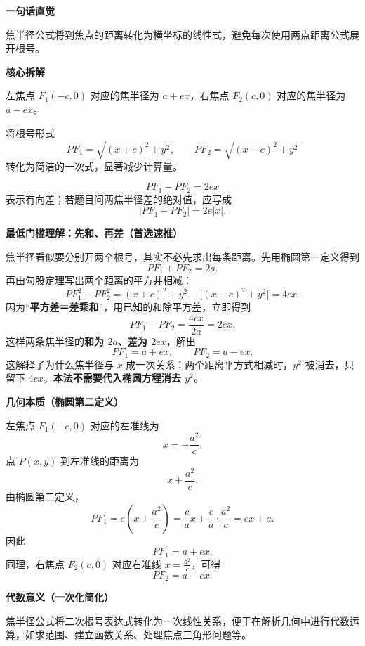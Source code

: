 \begin{explanationbox}
	\textbf{\textcolor{CExplanation}{一句话直觉}}

	焦半径公式将到焦点的距离转化为横坐标的线性式，避免每次使用两点距离公式展开根号。

	\medskip
	\textbf{\textcolor{CExplanation}{核心拆解}}
	\begin{description}[style=nextline, leftmargin=2.8em, labelsep=0.5em, itemsep=0.45em]
		\item[\textbf{要点一（左加右减）：}] 左焦点 $F_1(-c,0)$ 对应的焦半径为 $a+ex$，右焦点 $F_2(c,0)$ 对应的焦半径为 $a-ex$。
		\item[\textbf{要点二（线性转化）：}] 将根号形式
		      \[
			      PF_1=\sqrt{(x+c)^2+y^2},\qquad PF_2=\sqrt{(x-c)^2+y^2}
		      \]
		      转化为简洁的一次式，显著减少计算量。
		\item[\textbf{要点三（差要看方向）：}]
		      \[
			      PF_1-PF_2=2ex
		      \]
		      表示有向差；若题目问两焦半径差的绝对值，应写成
		      \[
			      |PF_1-PF_2|=2e|x|.
		      \]
	\end{description}

	\medskip
	\textbf{\textcolor{CExplanation}{最低门槛理解：先和、再差（首选速推）}}

	焦半径看似要分别开两个根号，其实不必先求出每条距离。先用椭圆第一定义得到
	\[
		PF_1+PF_2=2a.
	\]
	再由勾股定理写出两个距离的平方并相减：
	\[
		PF_1^2-PF_2^2=(x+c)^2+y^2-\bigl[(x-c)^2+y^2\bigr]=4cx.
	\]
	因为“\textbf{平方差＝差乘和}”，用已知的和除平方差，立即得到
	\[
		PF_1-PF_2=\frac{4cx}{2a}=2ex.
	\]
	这样两条焦半径的\textbf{和为 $2a$、差为 $2ex$}，解出
	\[
		PF_1=a+ex,\qquad PF_2=a-ex.
	\]
	这解释了为什么焦半径与 $x$ 成一次关系：两个距离平方式相减时，$y^2$ 被消去，只留下 $4cx$。\textbf{本法不需要代入椭圆方程消去 $y^2$。}

	\medskip
	\textbf{\textcolor{CExplanation}{几何本质（椭圆第二定义）}}

	左焦点 $F_1(-c,0)$ 对应的左准线为
	\[
		x=-\frac{a^2}{c}.
	\]
	点 $P(x,y)$ 到左准线的距离为
	\[
		x+\frac{a^2}{c}.
	\]
	由椭圆第二定义，
	\[
		PF_1=e\left(x+\frac{a^2}{c}\right)
		=\frac{c}{a}x+\frac{c}{a}\cdot\frac{a^2}{c}
		=ex+a.
	\]
	因此
	\[
		PF_1=a+ex.
	\]
	同理，右焦点 $F_2(c,0)$ 对应右准线 $x=\frac{a^2}{c}$，可得
	\[
		PF_2=a-ex.
	\]

	\medskip
	\textbf{\textcolor{CExplanation}{代数意义（一次化简化）}}

	焦半径公式将二次根号表达式转化为一次线性关系，便于在解析几何中进行代数运算，如求范围、建立函数关系、处理焦点三角形问题等。


\end{explanationbox}
